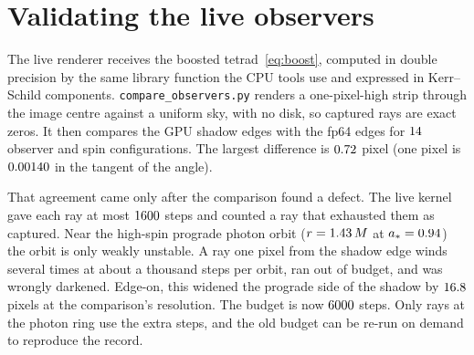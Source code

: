 \section{Validating the live observers}
\label{sec:xobsgpu}

The live renderer receives the boosted tetrad~\eqref{eq:boost}, computed in
double precision by the same library function the CPU tools use and
expressed in Kerr--Schild components. \texttt{compare\_observers.py} renders a
one-pixel-high strip through the image centre against a uniform sky, with no
disk, so captured rays are exact zeros. It then compares the GPU shadow edges
with the fp64 edges for $14$ observer and spin configurations. The
largest difference is $0.72$ pixel (one pixel is $0.00140$ in
the tangent of the angle).

That agreement came only after the comparison found a defect. The live
kernel gave each ray at most $1600$ steps and counted a ray
that exhausted them as captured. Near the high-spin prograde photon orbit
($r = 1.43\,M$ at $a_* = 0.94$) the orbit is only weakly unstable. A ray one
pixel from the shadow edge winds several times at about a thousand steps per
orbit, ran out of budget, and was wrongly darkened. Edge-on, this widened the
prograde side of the shadow by $16.8$ pixels at the comparison's
resolution. The budget is now $6000$ steps. Only rays at the photon ring use the
extra steps, and the old budget can be re-run on demand to reproduce the
record.

